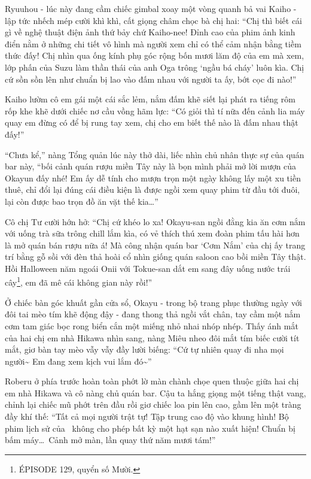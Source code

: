 \documentclass[../main.tex]{subfiles}
\begin{document}
Ryuuhou - lúc này đang cầm chiếc gimbal xoay một vòng quanh bả vai Kaiho - lập tức nhếch mép cười khì khì, cất giọng châm chọc bà chị hai: ``Chị thì biết cái gì về nghệ thuật điện ảnh thứ bảy chứ Kaiho-nee! Đỉnh cao của phim ảnh kinh điển nằm ở những chi tiết vô hình mà người xem chỉ có thể cảm nhận bằng tiềm thức đấy! Chị nhìn qua ống kính phụ góc rộng bốn mươi lăm độ của em mà xem, lớp phấn của Suzu làm thần thái của anh Oga trông `ngầu bá cháy' luôn kìa. Chị cứ sồn sồn lên như chuẩn bị lao vào đấm nhau với người ta ấy, bớt cọc đi nào!''

Kaiho lườm cô em gái một cái sắc lẻm, nắm đấm khẽ siết lại phát ra tiếng rôm rốp khe khẽ dưới chiếc nơ cầu vồng hãm lực: ``Có giỏi thì tí nữa đến cảnh lia máy quay em đừng có để bị rung tay xem, chị cho em biết thế nào là đấm nhau thật đấy!''

``Chưa kể,'' nàng Tổng quản lúc này thở dài, liếc nhìn chủ nhân thực sự của quán bar này, ``bối cảnh quán rượu miền Tây này là bọn mình phải mở lời mượn của Okayun đấy nhé! Em ấy dễ tính cho mượn trọn một ngày không lấy một xu tiền thuê, chỉ đổi lại đúng cái điều kiện là được ngồi xem quay phim từ đầu tới đuôi, lại còn được bao trọn đồ ăn vặt thế kia\dots''

Cô chị Tư cười hớn hở: ``Chị cứ khéo lo xa! Okayu-san ngồi đằng kia ăn cơm nắm với uống trà sữa trông chill lắm kìa, có vẻ thích thú xem đoàn phim tấu hài hơn là mở quán bán rượu nữa á! Mà công nhận quán bar `Cơm Nắm' của chị ấy trang trí bằng gỗ sồi với đèn thả hoài cổ nhìn giống quán saloon cao bồi miền Tây thật. Hồi Halloween năm ngoái Onii với Tokue-san dắt em sang đây uống nước trái cây\footnote{{\flaregothic ÉPISODE 129}, quyển số Mười.}, em đã mê cái không gian này rồi!''

Ở chiếc bàn góc khuất gần cửa sổ, Okayu - trong bộ trang phục thường ngày với đôi tai mèo tím khẽ động đậy - đang thong thả ngồi vắt chân, tay cầm một nắm cơm tam giác bọc rong biển cắn một miếng nhỏ nhai nhóp nhép. Thấy ánh mắt của hai chị em nhà Hikawa nhìn sang, nàng Miêu nheo đôi mắt tím biếc cười tít mắt, giơ bàn tay mèo vẫy vẫy đầy lười biếng: ``Cứ tự nhiên quay đi nha mọi người\~{} Em đang xem kịch vui lắm đó\~{}''

Roberu ở phía trước hoàn toàn phớt lờ màn chành chọe quen thuộc giữa hai chị em nhà Hikawa và cô nàng chủ quán bar. Cậu ta hắng giọng một tiếng thật vang, chỉnh lại chiếc mũ phớt trên đầu rồi giơ chiếc loa pin lên cao, gầm lên một tràng đầy khí thế: ``Tất cả mọi người trật tự! Tập trung cao độ vào khung hình! Bộ phim lịch sử của \hls\ không cho phép bất kỳ một hạt sạn nào xuất hiện! Chuẩn bị bấm máy\dots\ Cảnh mở màn, lần quay thứ năm mươi tám!''
\end{document}
